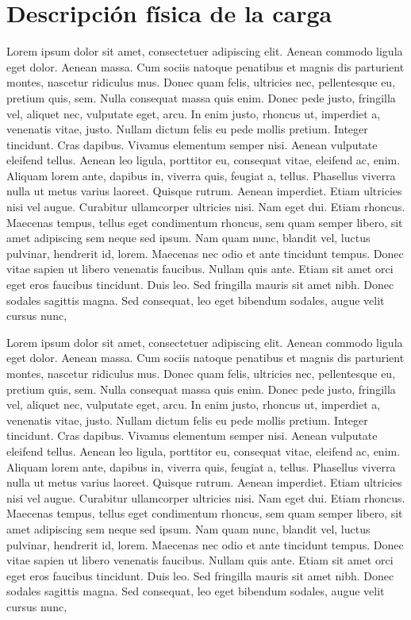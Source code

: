 \chapter{Descripción física de la carga}
\label{ch:no_lineal}
Lorem ipsum dolor sit amet, consectetuer adipiscing elit. Aenean commodo ligula eget dolor. Aenean massa. Cum sociis natoque penatibus et magnis dis parturient montes, nascetur ridiculus mus. Donec quam felis, ultricies nec, pellentesque eu, pretium quis, sem. Nulla consequat massa quis enim. Donec pede justo, fringilla vel, aliquet nec, vulputate eget, arcu. In enim justo, rhoncus ut, imperdiet a, venenatis vitae, justo. Nullam dictum felis eu pede mollis pretium. Integer tincidunt. Cras dapibus. Vivamus elementum semper nisi. Aenean vulputate eleifend tellus. Aenean leo ligula, porttitor eu, consequat vitae, eleifend ac, enim. Aliquam lorem ante, dapibus in, viverra quis, feugiat a, tellus. Phasellus viverra nulla ut metus varius laoreet. Quisque rutrum. Aenean imperdiet. Etiam ultricies nisi vel augue. Curabitur ullamcorper ultricies nisi. Nam eget dui. Etiam rhoncus. Maecenas tempus, tellus eget condimentum rhoncus, sem quam semper libero, sit amet adipiscing sem neque sed ipsum. Nam quam nunc, blandit vel, luctus pulvinar, hendrerit id, lorem. Maecenas nec odio et ante tincidunt tempus. Donec vitae sapien ut libero venenatis faucibus. Nullam quis ante. Etiam sit amet orci eget eros faucibus tincidunt. Duis leo. Sed fringilla mauris sit amet nibh. Donec sodales sagittis magna. Sed consequat, leo eget bibendum sodales, augue velit cursus nunc,

Lorem ipsum dolor sit amet, consectetuer adipiscing elit. Aenean commodo ligula eget dolor. Aenean massa. Cum sociis natoque penatibus et magnis dis parturient montes, nascetur ridiculus mus. Donec quam felis, ultricies nec, pellentesque eu, pretium quis, sem. Nulla consequat massa quis enim. Donec pede justo, fringilla vel, aliquet nec, vulputate eget, arcu. In enim justo, rhoncus ut, imperdiet a, venenatis vitae, justo. Nullam dictum felis eu pede mollis pretium. Integer tincidunt. Cras dapibus. Vivamus elementum semper nisi. Aenean vulputate eleifend tellus. Aenean leo ligula, porttitor eu, consequat vitae, eleifend ac, enim. Aliquam lorem ante, dapibus in, viverra quis, feugiat a, tellus. Phasellus viverra nulla ut metus varius laoreet. Quisque rutrum. Aenean imperdiet. Etiam ultricies nisi vel augue. Curabitur ullamcorper ultricies nisi. Nam eget dui. Etiam rhoncus. Maecenas tempus, tellus eget condimentum rhoncus, sem quam semper libero, sit amet adipiscing sem neque sed ipsum. Nam quam nunc, blandit vel, luctus pulvinar, hendrerit id, lorem. Maecenas nec odio et ante tincidunt tempus. Donec vitae sapien ut libero venenatis faucibus. Nullam quis ante. Etiam sit amet orci eget eros faucibus tincidunt. Duis leo. Sed fringilla mauris sit amet nibh. Donec sodales sagittis magna. Sed consequat, leo eget bibendum sodales, augue velit cursus nunc,

